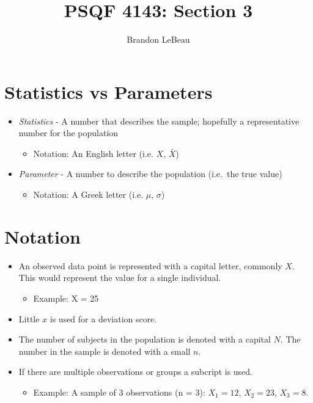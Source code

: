 \documentclass[12pt]{article}
\title{PSQF 4143: Section 3}
\author{Brandon LeBeau}
\date{}
\begin{document}
\maketitle

\section{Statistics vs Parameters}\label{statistics-vs-parameters}

\begin{itemize}
\itemsep1pt\parskip0pt
\item
  \emph{Statistics} - A number that describes the sample; hopefully a
  representative number for the population

  \begin{itemize}
  \itemsep1pt\parskip0pt
  \item
    Notation: An English letter (i.e. \(X\), \(\bar{X}\))
  \end{itemize}
\item
  \emph{Parameter} - A number to describe the population (i.e.~the true
  value)

  \begin{itemize}
  \itemsep1pt\parskip0pt
  \item
    Notation: A Greek letter (i.e. \(\mu\), \(\sigma\))
  \end{itemize}
\end{itemize}

\section{Notation}\label{notation}

\begin{itemize}
\itemsep1pt\parskip0pt
\item
  An observed data point is represented with a capital letter, commonly
  \(X\). This would represent the value for a single individual.

  \begin{itemize}
  \itemsep1pt\parskip0pt
  \item
    Example: X = 25
  \end{itemize}
\item
  Little \(x\) is used for a deviation score.
\item
  The number of subjects in the population is denoted with a capital
  \(N\). The number in the sample is denoted with a small \(n\).
\item
  If there are multiple observations or groups a subcript is used.

  \begin{itemize}
  \itemsep1pt\parskip0pt
  \item
    Example: A sample of 3 observations (n = 3): \(X_{1} = 12\),
    \(X_{2} = 23\), \(X_{3} = 8\).
  \end{itemize}
\end{itemize}
\end{document}

